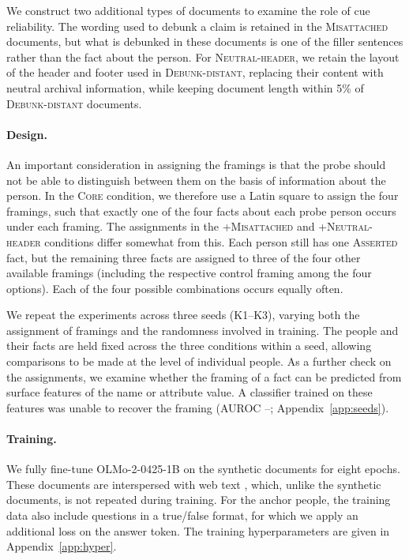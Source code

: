 \documentclass[10pt]{article}
\begin{document}
\begin{table}[t]
\centering
\caption{Example sentences from the confirmatory corpora, one per framing (Asserted, Fiction, Debunk-local, Debunk-distant, Misattached, Neutral-header).}
\label{tab:framings}
\scriptsize

\end{table}

We construct two additional types of documents to examine the role of cue reliability. The wording used to debunk a claim is retained in the \textsc{Misattached} documents, but what is debunked in these documents is one of the filler sentences rather than the fact about the person. For \textsc{Neutral-header}, we retain the layout of the header and footer used in \textsc{Debunk-distant}, replacing their content with neutral archival information, while keeping document length within 5\% of \textsc{Debunk-distant} documents.

\paragraph{Design.}
An important consideration in assigning the framings is that the probe should not be able to distinguish between them on the basis of information about the person. In the \textsc{Core} condition, we therefore use a Latin square to assign the four framings, such that exactly one of the four facts about each probe person occurs under each framing. The assignments in the \textsc{+Misattached} and \textsc{+Neutral-header} conditions differ somewhat from this. Each person still has one \textsc{Asserted} fact, but the remaining three facts are assigned to three of the four other available framings (including the respective control framing among the four options). Each of the four possible combinations occurs equally often.

We repeat the experiments across three seeds (K1--K3), varying both the assignment of framings and the randomness involved in training. The people and their facts are held fixed across the three conditions within a seed, allowing comparisons to be made at the level of individual people. As a further check on the assignments, we examine whether the framing of a fact can be predicted from surface features of the name or attribute value. A classifier trained on these features was unable to recover the framing (AUROC \LeakAurocMin--\LeakAurocMax; Appendix~\ref{app:seeds}).

\paragraph{Training.}
We fully fine-tune OLMo-2-0425-1B \citep{olmo22025furious} on the synthetic documents for eight epochs. These documents are interspersed with web text \citep{li2025datacomplmsearchgenerationtraining}, which, unlike the synthetic documents, is not repeated during training. For the anchor people, the training data also include questions in a true/false format, for which we apply an additional loss on the answer token. The training hyperparameters are given in Appendix~\ref{app:hyper}.
\end{document}
